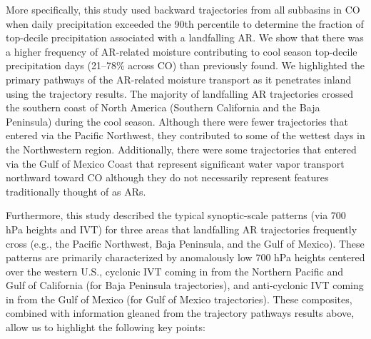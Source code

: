 \documentclass[draft]{agujournal2019}
\begin{document}

More specifically, this study used backward trajectories from all subbasins in CO when daily precipitation exceeded the 90th percentile to determine the fraction of top-decile precipitation associated with a landfalling AR. We show that there was a higher frequency of AR-related moisture contributing to cool season top-decile precipitation days (21--78\% across CO) than previously found. We highlighted the primary pathways of the AR-related moisture transport as it penetrates inland using the trajectory results. The majority of landfalling AR trajectories crossed the southern coast of North America (Southern California and the Baja Peninsula) during the cool season. Although there were fewer trajectories that entered via the Pacific Northwest, they contributed to some of the wettest days in the Northwestern region. Additionally, there were some trajectories that entered via the Gulf of Mexico Coast that represent significant water vapor transport northward toward CO although they do not necessarily represent features traditionally thought of as ARs.

Furthermore, this study described the typical synoptic-scale patterns (via 700 hPa heights and IVT) for three areas that landfalling AR trajectories frequently cross (e.g., the Pacific Northwest, Baja Peninsula, and the Gulf of Mexico). These patterns are primarily characterized by anomalously low 700 hPa heights centered over the western U.S., cyclonic IVT coming in from the Northern Pacific and Gulf of California (for Baja Peninsula trajectories), and anti-cyclonic IVT coming in from the Gulf of Mexico (for Gulf of Mexico trajectories). These composites, combined with information gleaned from the trajectory pathways results above, allow us to highlight the following key points:
\end{document}
